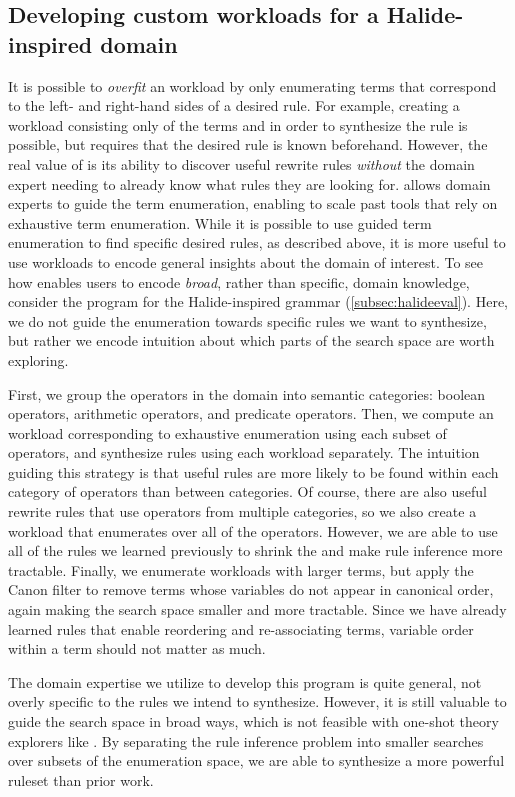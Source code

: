 \subsection{Developing custom workloads for a Halide-inspired domain}
\label{subsec:halide-appendix}
It is possible to \textit{overfit} an \enumo workload by only enumerating terms
  that correspond to the left- and right-hand sides of a desired rule.
For example, creating a workload consisting only of the terms
   and  in
  order to synthesize the rule 
  is possible, but requires that the desired rule is known beforehand.
However, the real value of \enumo is its ability to discover useful rewrite rules
  \textit{without} the domain expert needing to already know what rules they
  are looking for.
\enumo allows domain experts to guide the term enumeration, enabling \enumo
  to scale past tools that rely on exhaustive term enumeration.
While it is possible to use guided term enumeration to find specific desired rules,
  as described above, it is more useful to use \enumo workloads to encode
  general insights about the domain of interest.
To see how \enumo enables users to encode \textit{broad}, rather than specific,
  domain knowledge, consider the \enumo program for the Halide-inspired
  grammar (\autoref{subsec:halideeval}).
Here, we do not guide the enumeration towards specific rules we want to synthesize,
  but rather we encode intuition about which parts of the search space are worth
  exploring.

First, we group the operators in the domain into semantic categories:
  boolean operators, arithmetic operators, and predicate operators.
Then, we compute an \enumo workload corresponding to exhaustive enumeration
  using each subset of operators, and synthesize rules using each workload separately.
The intuition guiding this strategy is that useful rules are more likely to be found
  within each category of operators than between categories.
Of course, there are also useful rewrite rules that use operators from multiple categories,
  so we also create a workload that enumerates over all of the operators.
However, we are able to use all of the rules we learned previously to shrink the
  \egraph and make rule inference more tractable.
Finally, we enumerate workloads with larger terms, but apply the \enumo{} \textsf{Canon}
  filter to remove terms whose variables do not appear in canonical order,
  again making the search space smaller and more tractable.
Since we have already learned rules that enable reordering
  and re-associating terms, variable order within a term should not matter as much.

The domain expertise we utilize to develop this \enumo program is
  quite general, not overly specific to the rules we intend to synthesize.
However, it is still valuable to guide the search space in broad ways,
  which is not feasible with one-shot theory explorers like .
By separating the rule inference problem into smaller searches over subsets of
  the enumeration space, we are able to synthesize a more powerful ruleset
  than prior work.
